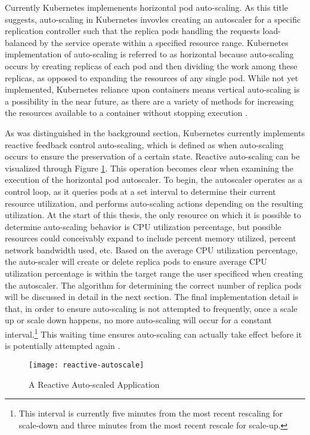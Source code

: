 Currently Kubernetes implemenents horizontal pod auto-scaling.
As this title suggests, auto-scaling in
Kubernetes invovles creating an autoscaler for a specific replication
controller such that the replica pods handling the requests load-balanced by the service
operate within a specified resource range. Kubernetes
implementation of auto-scaling is referred to as horizontal because
auto-scaling occurs by creating replicas of each pod and then dividing the work
among these replicas, as opposed to expanding the resources of any single pod.
While not yet implemented, Kubernetes reliance upon containers means vertical
auto-scaling is a possibility in the near future, as there are a variety of
methods for increasing the resources available to a container without stopping
execution \cite{docker-up-and-running}.

As was distinguished in the background section, Kubernetes currently implements reactive
feedback control auto-scaling, which is defined as when auto-scaling occurs to
ensure the preservation of a certain state. Reactive auto-scaling can be
visualized through Figure \ref{fig:reactive-autoscale}.
This operation becomes clear when examining
the execution of the horizontal pod autoscaler. To begin, the autoscaler
operates as a control loop, as it queries pods at a set interval to determine
their current resource utilization, and performs auto-scaling actions depending on the
resulting utilization. At the start of this thesis, the only resource on which it is possible to
determine auto-scaling behavior is CPU utilization percentage, but possible
resources could conceivably expand to include percent memory utilized, percent
network bandwidth used, etc. Based on the average CPU utilization percentage, the
auto-scaler will create or delete replica pods to ensure average CPU utilization
percentage is within the target range the user specificed when creating the
autoscaler. The algorithm for determining the correct number of replica pods
will be discussed in detail in the next section. The final implementation detail
is that, in order to ensure auto-scaling is not attempted to frequently, once a
scale up or scale down happens, no more auto-scaling will occur for a constant
interval.\footnote{This interval is currently five minutes from the most recent
rescaling for scale-down and three minutes from the most recent rescale for
scale-up.} This waiting time ensures auto-scaling can actually take effect
before it is potentially attempted again \cite{k8s-horizontal-pod-autoscaler-user-guide}.

\begin{figure}[!h]
  \centerline{\texttt{[image: reactive-autoscale]}}
  \caption{A Reactive Auto-scaled Application}
  \label{fig:reactive-autoscale}
\end{figure}
